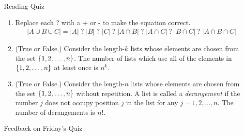 \documentclass[10pt]{beamer}
\begin{document}
\begin{frame}[standout]
Reading Quiz
\end{frame}

\begin{frame}

\begin{mygreenbox}[title= Reading Quiz (Inclusion-Exclusion)]
\footnotesize 
\begin{enumerate}
	\item Replace each ? with a + or - to make the equation correct.
	\begin{align*}
	|A \cup B \cup C| = |A| \; ? \; |B| \; ? \; |C| \; ? \;  |A \cap B| \; ? \; |A \cap C| \; ? \; |B \cap C| \; ? \; | A \cap B \cap C|	
	\end{align*}

	\item (True or False.) Consider the length-$k$ lists whose elements are chosen from the set $\{ {1,2,\hdots, n} \}$.  The number of lists which use all of the elements in $\{ {1,2,\hdots, n} \}$ at least once is $n^k$.
	\item (True or False.) Consider the length-$n$ lists whose elements are chosen from the set $\{ {1,2,\hdots,n} \}$ without repetition. A list is called a \textit{derangement} if the number $j$ does not occupy position $j$ in the list for any $j=1,2,\hdots,n$.  The number of derangements is $n!$. 
	\end{enumerate}
\end{mygreenbox}
	
\end{frame}

\begin{frame}[standout]
Feedback on Friday's Quiz 
\end{frame}
\end{document}

